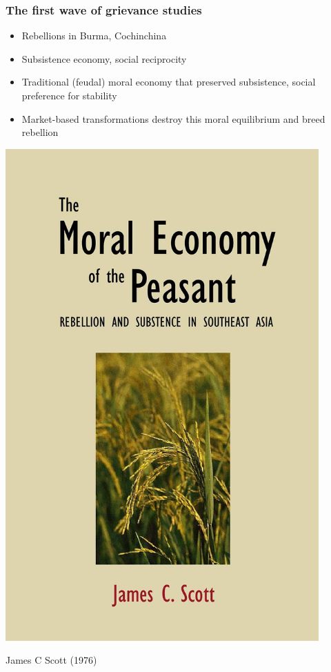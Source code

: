 \documentclass[utf8, xcolor=dvipsnames]{beamer}
\begin{document}
\begin{frame}
\frametitle{The first wave of grievance studies}
\centering

\begin{minipage}{0.59\textwidth}\centering
\begin{itemize}
  \item Rebellions in Burma, Cochinchina
  \item Subsistence economy, social reciprocity
  \item Traditional (feudal) moral economy that preserved subsistence, social preference for stability
  \item Market-based transformations destroy this moral equilibrium and breed rebellion
\end{itemize}
\end{minipage}\hfill
\begin{minipage}{0.4\textwidth}\centering
\includegraphics[width = 0.9\textwidth]{img/scott_moral}

James C Scott (1976)
\end{minipage}

\end{frame}
\end{document}
